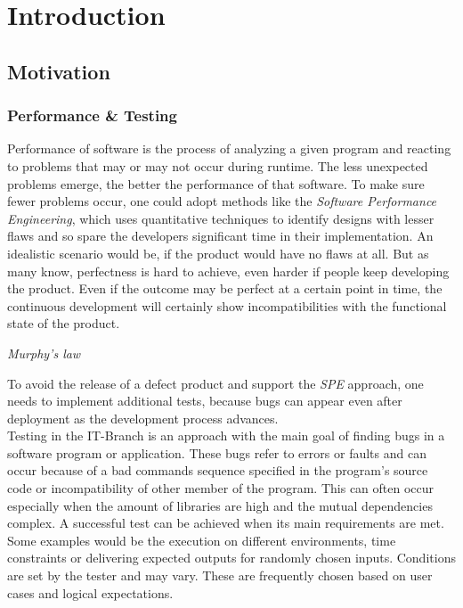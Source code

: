 %
\chapter{Introduction}
\section{Motivation}
\subsection{Performance \& Testing}
Performance of software is the process of analyzing a given program and reacting to problems that may or may not occur during runtime. The less unexpected problems emerge, the better the performance of that software\cite{8432081}. 
To make sure fewer problems occur, one could adopt methods like the \textit{Software Performance Engineering}, which uses quantitative techniques to identify designs with lesser flaws and so spare the developers significant time in their implementation\cite{4299916}. An idealistic scenario would be, if the product would have no flaws at all. But as many know, perfectness is hard to achieve, even harder if people keep developing the product. Even if the outcome may be perfect at a certain point in time, the continuous development will certainly show incompatibilities with the functional state of the product.
\begin{center}
	\begin{flushright}
		\textit{Murphy's law}
	\end{flushright}
\end{center}
To avoid the release of a defect product and support the \textit{SPE} approach, one needs to implement additional tests, because bugs can appear even after deployment as the development process advances.\\
Testing in the IT-Branch is an approach with the main goal of finding bugs in a software program or application. These bugs refer to errors or faults and can occur because of a bad commands sequence specified in the program's source code or incompatibility of other member of the program. This can often occur especially when the \dq amount of libraries are high and the mutual dependencies complex\dq{}\cite{7302456}. A successful test can be achieved when its main requirements are met. Some examples would be the execution on different environments, time constraints or delivering expected outputs for randomly chosen inputs. Conditions are set by the tester and may vary. These are frequently chosen based on user cases and logical expectations.\newpage
